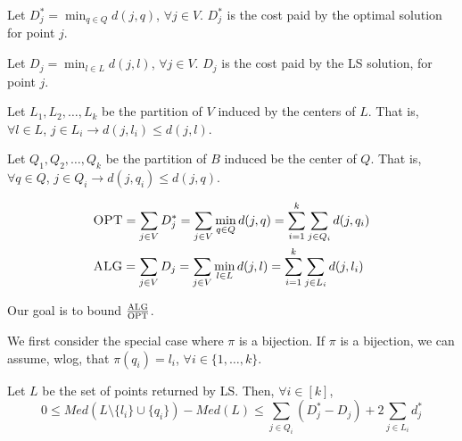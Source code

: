     Let $D_j^* = \min_{q \in Q} d(j,q)$, $\forall j \in V$. $D_j^*$ is the cost paid by the optimal solution for point $j$.

    Let $D_j = \min_{l \in L} d(j,l)$, $\forall j \in V$. $D_j$ is the cost paid by the LS solution, for point $j$.

    Let $L_1, L_2, \dots, L_k$ be the partition of $V$ induced by the centers of $L$.
    That is, $\forall l \in L$, $j \in L_i \rightarrow d(j,l_i) \leq d(j,l)$.

    Let $Q_1, Q_2, \dots, Q_k$ be the partition of $B$ induced be the center of $Q$.
    That is, $\forall q \in Q$, $j \in Q_i \rightarrow d(j,q_i) \leq d(j,q)$.

    \begin{equation*}
        \begin{split}
            &\textsc{OPT} = \sum_{j \in V} D_j^* = \sum_{j \in V} \min_{q \in Q} d(j,q) = \sum_{i=1}^{k} \sum_{j \in Q_i} d(j,q_i)\\
            &\textsc{ALG} = \sum_{j \in V} D_j = \sum_{j \in V} \min_{l \in L} d(j,l) = \sum_{i=1}^{k} \sum_{j \in L_i} d(j,l_i)
        \end{split}
    \end{equation*}

    Our goal is to bound $\frac{\textsc{ALG}}{\textsc{OPT}}$.

    We first consider the special case where $\pi$ is a bijection.
    If $\pi$ is a bijection, we can assume, wlog, that $\pi(q_i) = l_i$, $\forall i \in \{ 1, \dots, k \}$.

    \begin{lemma}\label{lemma:kmedian}
        Let $L$ be the set of points returned by LS.
        Then, $\forall i \in [k]$,
        \[ 0 \leq Med(L \setminus \{l_i\} \cup \{q_i\}) - Med(L) \leq \sum_{j \in Q_i}(D_j^* - D_j) + 2 \sum_{j \in L_i} d_j^* \]
    \end{lemma}

